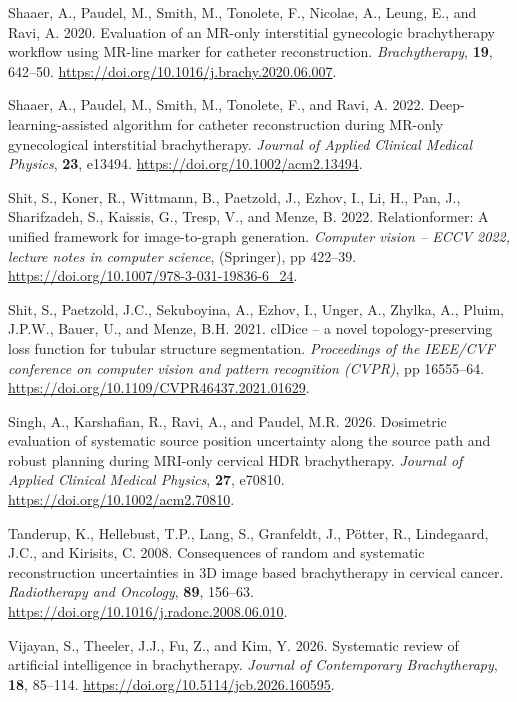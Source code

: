 \documentclass[
  11pt,
]{article}
\newlength{\cslhangindent}
\newenvironment{CSLReferences}[2] %
 {\begin{list}{}{%
  \setlength{\itemindent}{0pt}
  \setlength{\leftmargin}{0pt}
  \setlength{\parsep}{0pt}
  \ifodd #1
   \setlength{\leftmargin}{\cslhangindent}
   \setlength{\itemindent}{-1\cslhangindent}
  \fi
  \setlength{\itemsep}{#2\baselineskip}}}
 {\end{list}}
\begin{document}
\begin{CSLReferences}{1}{1}
Shaaer, A., Paudel, M., Smith, M., Tonolete, F., Nicolae, A., Leung, E.,
and Ravi, A. 2020. Evaluation of an {MR}-only interstitial gynecologic
brachytherapy workflow using {MR}-line marker for catheter
reconstruction. \emph{Brachytherapy}, \textbf{19}, 642--50.
\url{https://doi.org/10.1016/j.brachy.2020.06.007}.

Shaaer, A., Paudel, M., Smith, M., Tonolete, F., and Ravi, A. 2022.
Deep-learning-assisted algorithm for catheter reconstruction during
{MR}-only gynecological interstitial brachytherapy. \emph{Journal of
Applied Clinical Medical Physics}, \textbf{23}, e13494.
\url{https://doi.org/10.1002/acm2.13494}.

Shit, S., Koner, R., Wittmann, B., Paetzold, J., Ezhov, I., Li, H., Pan,
J., Sharifzadeh, S., Kaissis, G., Tresp, V., and Menze, B. 2022.
Relationformer: A unified framework for image-to-graph generation.
\emph{Computer vision -- ECCV 2022, lecture notes in computer science},
(Springer), pp 422--39.
\url{https://doi.org/10.1007/978-3-031-19836-6_24}.

Shit, S., Paetzold, J.C., Sekuboyina, A., Ezhov, I., Unger, A., Zhylka,
A., Pluim, J.P.W., Bauer, U., and Menze, B.H. 2021. {clDice} -- a novel
topology-preserving loss function for tubular structure segmentation.
\emph{Proceedings of the IEEE/CVF conference on computer vision and
pattern recognition (CVPR)}, pp 16555--64.
\url{https://doi.org/10.1109/CVPR46437.2021.01629}.

Singh, A., Karshafian, R., Ravi, A., and Paudel, M.R. 2026. Dosimetric
evaluation of systematic source position uncertainty along the source
path and robust planning during {MRI}-only cervical {HDR} brachytherapy.
\emph{Journal of Applied Clinical Medical Physics}, \textbf{27}, e70810.
\url{https://doi.org/10.1002/acm2.70810}.

Tanderup, K., Hellebust, T.P., Lang, S., Granfeldt, J., Pötter, R.,
Lindegaard, J.C., and Kirisits, C. 2008. Consequences of random and
systematic reconstruction uncertainties in {3D} image based
brachytherapy in cervical cancer. \emph{Radiotherapy and Oncology},
\textbf{89}, 156--63.
\url{https://doi.org/10.1016/j.radonc.2008.06.010}.

Vijayan, S., Theeler, J.J., Fu, Z., and Kim, Y. 2026. Systematic review
of artificial intelligence in brachytherapy. \emph{Journal of
Contemporary Brachytherapy}, \textbf{18}, 85--114.
\url{https://doi.org/10.5114/jcb.2026.160595}.


\end{CSLReferences}
\end{document}
